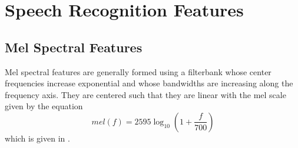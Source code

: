 \chapter{Speech Recognition Features}

\section{Mel Spectral Features}
\label{sec:mel-spectral-features}

Mel spectral features are generally formed using a filterbank
whose center frequencies increase exponential and whose 
bandwidths are increasing along the frequency axis.  They are
centered such that they are linear with the mel scale given
by the equation
\begin{equation}
mel(f) = 2595 \log_{10}\left(1 + \frac{f}{700}\right)
\end{equation}
which is given in \cite{wiki:mel_scale}.
